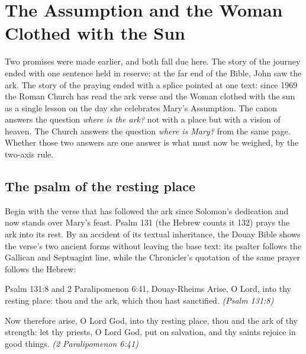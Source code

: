 \sectionguard
\section{The Assumption and the Woman Clothed with the Sun}

Two promises were made earlier, and both fall due here. The story of the
journey ended with one sentence held in reserve: at the far end of the
Bible, John saw the ark. The story of the praying ended with a splice
pointed at one text: since 1969 the Roman Church has read the ark verse and the
Woman clothed with the sun as a single lesson on the day she celebrates
Mary's Assumption. The canon answers the question \emph{where is the
ark?} not with a place but with a vision of heaven. The Church answers
the question \emph{where is Mary?} from the same page. Whether those two
answers are one answer is what must now be weighed, by the two-axis
rule.

\subsection{The psalm of the resting place}

Begin with the verse that has followed the ark since Solomon's dedication
and now stands over Mary's feast. Psalm 131 (the Hebrew counts it 132)
prays the ark into its rest. By an accident of its textual inheritance,
the Douay Bible shows the verse's two ancient forms without leaving the
base text: its psalter follows the Gallican and Septuagint line, while
the Chronicler's quotation of the same prayer follows the Hebrew:

\begin{witnessbox}{Psalm 131:8 and 2 Paralipomenon 6:41, Douay-Rheims}
Arise, O Lord, into thy resting place: thou and the ark, which thou hast
sanctified. \emph{(Psalm 131:8)}

Now therefore arise, O Lord God, into thy resting place, thou and the ark
of thy strength: let thy priests, O Lord God, put on salvation, and thy
saints rejoice in good things. \emph{(2 Paralipomenon 6:41)}
\end{witnessbox}

